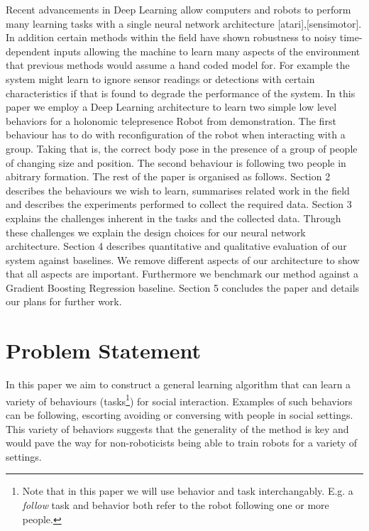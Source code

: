 \documentclass[letterpaper, 10 pt, conference]{ieeeconf}
\begin{document}
 Recent advancements in Deep Learning allow computers and robots to perform many learning tasks with a single neural network architecture [atari],[sensimotor]. In addition certain methods within the field have shown robustness to noisy time-dependent inputs allowing the machine to learn many aspects of the environment that previous methods would assume a hand coded model for. For example the system might learn to ignore sensor readings or detections with certain characteristics if that is found to degrade the performance of the system. In this paper we employ a Deep Learning architecture to learn two simple low level behaviors for a holonomic telepresence Robot from demonstration. The first behaviour has to do with reconfiguration of the robot when interacting with a group. Taking that is, the correct body pose in the presence of a group of people of changing size and position. The second behaviour is following two people in abitrary formation. The rest of the paper is organised as follows. Section 2 describes the behaviours we wish to learn, summarises related work in the field and describes the experiments performed to collect the required data. Section 3 explains the challenges inherent in the tasks and the collected data. Through these challenges we explain the design choices for our neural network architecture. Section 4 describes quantitative and qualitative evaluation of our system against baselines. We remove different aspects of our architecture to show that all aspects are important. Furthermore we benchmark our method against a Gradient Boosting Regression baseline. Section 5 concludes the paper and details our plans for further work.

\section{Problem Statement \label{sec:related_work}}

In this paper we aim to construct a general learning algorithm that can learn a variety of behaviours (tasks\footnote{Note that in this paper we will use behavior and task interchangably. E.g. a \emph{follow} task and behavior both refer to the robot following one or more people.}) for social interaction. Examples of such behaviors can be following, escorting avoiding or conversing with people in social settings. This variety of behaviors suggests that the generality of the method is key and would pave the way for non-roboticists being able to train robots for a variety of settings. 
\end{document}
